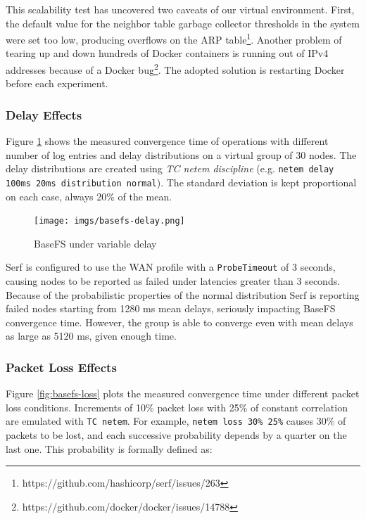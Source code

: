 \documentclass{sig-alternate}
\begin{document}
This scalability test has uncovered two caveats of our virtual environment. First, the default value for the neighbor table garbage collector thresholds in the system were set too low, producing overflows on the ARP table\footnote{https://github.com/hashicorp/serf/issues/263}. Another problem of tearing up and down hundreds of Docker containers is running out of IPv4 addresses because of a Docker bug\footnote{https://github.com/docker/docker/issues/14788}. The adopted solution is restarting Docker before each experiment. 


\subsubsection{Delay Effects}

Figure \ref{fig:basefs-delay} shows the measured convergence time of operations with different number of log entries and delay distributions on a virtual group of 30 nodes. The delay distributions are created using \textit{TC netem discipline} (e.g. \texttt{netem delay 100ms 20ms distribution normal}). The standard deviation is kept proportional on each case, always 20\% of the mean.

\begin{figure}
\centering
\texttt{[image: imgs/basefs-delay.png]}
\caption{BaseFS under variable delay}
\label{fig:basefs-delay}
\end{figure}


Serf is configured to use the WAN profile with a \texttt{ProbeTimeout} of 3 seconds, causing nodes to be reported as failed under latencies greater than 3 seconds. Because of the probabilistic properties of the normal distribution Serf is reporting failed nodes starting from 1280 ms mean delays, seriously impacting BaseFS convergence time. However, the group is able to converge even with mean delays as large as 5120 ms, given enough time.


\subsubsection{Packet Loss Effects}

Figure \ref{fig:basefs-loss} plots the measured convergence time under different packet loss conditions. Increments of 10\% packet loss with 25\% of constant correlation are emulated with \texttt{TC netem}. For example, \texttt{netem loss 30\% 25\%} causes 30\% of packets to be lost, and each successive probability depends by a quarter on the last one. This probability is formally defined as:
\end{document}
